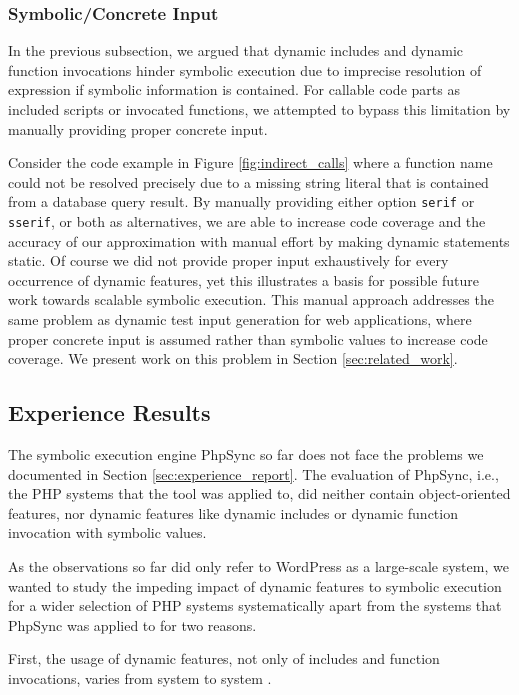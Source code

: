 \documentclass[sigconf]{acmart}
\renewcommand{\sf}[1]{\textsf{#1}}
\renewcommand{\tt}[1]{\texttt{#1}}
\begin{document}
\subsubsection{Symbolic/Concrete Input}
In the previous subsection, we argued that dynamic includes and dynamic
function invocations hinder symbolic execution  due to imprecise resolution of
expression if symbolic information is contained. For callable code parts as
included scripts or invocated functions, we attempted to bypass this limitation
by manually providing proper concrete input.

Consider the code example in Figure \ref{fig:indirect_calls} where a function
name could not be resolved precisely due to a missing string literal that is contained from a
database query result. By manually providing either option \tt{serif} or
\tt{sserif}, or both as alternatives, we are able to increase code coverage and
the accuracy of our approximation with manual effort by making dynamic
statements static. Of course we did not provide proper input exhaustively for
every occurrence of dynamic features, yet this illustrates a basis for possible
future work towards scalable symbolic execution. This manual approach addresses
the same problem as dynamic test input generation for web applications, where
proper concrete input is assumed rather than symbolic values to increase code
coverage. We present work on this problem in Section \ref{sec:related_work}.

\subsection{Experience Results} \label{sec:experience_results}
The symbolic execution engine \sf{PhpSync} \cite{Nguyen:2014:BCG:2635868.2635928} so far does not face the
problems we documented in Section \ref{sec:experience_report}. The evaluation of
PhpSync, i.e., the PHP systems that the tool was applied to, did neither contain object-oriented
features, nor dynamic features like dynamic includes or dynamic function
invocation with symbolic values.
 
As the observations so far did only refer to \sf{WordPress} as a large-scale
system, we wanted to study the impeding impact of dynamic features to symbolic
execution for a wider selection of PHP systems systematically apart from the
systems that \sf{PhpSync} was applied to for two reasons. 

First, the usage of dynamic features, not only of includes and function invocations, varies from
system to system \cite{hills2015variable}. 
\end{document}
